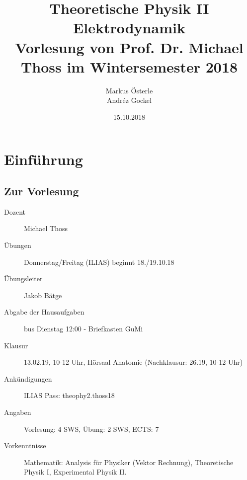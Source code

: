 \documentclass[titlepage,11pt,a4paper,ngerman]{report}
\begin{document}

\title{
	{\Huge Theoretische Physik II\\[3pt]Elektrodynamik}\\[1em]
	{\Large Vorlesung von Prof. Dr. Michael Thoss im Wintersemester 2018}}
\author{Markus Österle\\ Andréz Gockel}
\date{15.10.2018}
\maketitle
\tableofcontents

\setcounter{chapter}{-1}
\chapter{Einführung}

%
%

\section{Zur Vorlesung}

\begin{description}
	\item[Dozent] Michael Thoss
	\item[Übungen] Donnerstag/Freitag (ILIAS) beginnt 18./19.10.18
	\item[Übungsleiter] Jakob Bätge
	\item[Abgabe der Hausaufgaben] bus Dienstag 12:00 - Briefkasten GuMi
	\item[Klausur] 13.02.19, 10-12 Uhr, Hörsaal Anatomie (Nachklausur: 26.19, 10-12 Uhr)
	\item[Ankündigungen] ILIAS Pass: theophy2.thoss18
	\item[Angaben] Vorlesung: 4 SWS, Übung: 2 SWS, ECTS: 7 
	\item[Vorkenntnisse] Mathematik: Analysis für Physiker (Vektor Rechnung), Theoretische Physik I, Experimental Physik II. 
\end{description}
\end{document}
